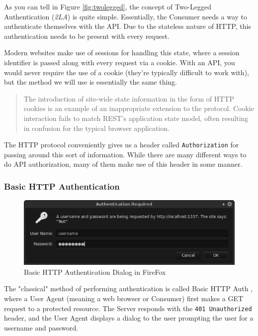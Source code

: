 \documentclass{book}
\begin{document}
As you can tell in Figure \ref{fig:twolegged}, the concept of Two-Legged Authentication (\emph{2LA}) is quite simple. Essentially, the Consumer needs a way to authenticate themselves with the API. Due to the stateless nature of HTTP, this authentication needs to be present with every request.

Modern websites make use of sessions for handling this state, where a session identifier is passed along with every request via a cookie. With an API, you would never require the use of a cookie (they're typically difficult to work with), but the method we will use is essentially the same thing.

\begin{quote}
The introduction of site-wide state information in the form of HTTP cookies is an example of an inappropriate extension to the protocol. Cookie interaction fails to match REST’s application state model, often resulting in confusion for the typical browser application.\cite[Page 145]{ACMV2N2}
\end{quote}

The HTTP protocol conveniently gives us a header called \texttt{Authorization} for passing around this sort of information. While there are many different ways to do API authorization, many of them make use of this header in some manner.

\subsubsection{Basic HTTP Authentication}

\begin{figure}[ht!]
\centering
\includegraphics[width=140mm]{images/basic-http-auth.png}
\caption{Basic HTTP Authentication Dialog in FireFox}
\label{fig:basichhtpauth}
\end{figure}

The "classical" method of performing authentication is called Basic HTTP Auth \cite{RFC2617}, where a User Agent (meaning a web browser or Consumer) first makes a GET request to a protected resource. The Server responds with the \texttt{401 Unauthorized} header, and the User Agent displays a dialog to the user prompting the user for a username and password.
\end{document}
